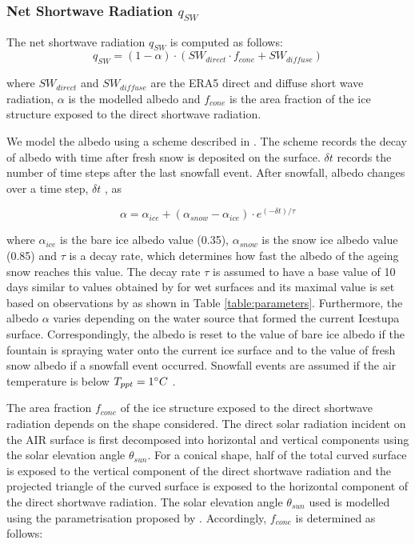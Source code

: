 \documentclass[utf8]{frontiersSCNS} %
\begin{document}
\subsubsection{Net Shortwave Radiation \texorpdfstring{$q_{SW}$}{Lg}} The net shortwave radiation $q_{SW}$ is computed as follows:
\begin{equation} q_{SW} = (1- \alpha)\cdot (SW_{direct} \cdot f_{cone} + SW_{diffuse}) \label{eqn:SW} \end{equation}

where $SW_{direct}$ and $SW_{diffuse}$ are the ERA5 direct and diffuse short wave radiation, $\alpha$ is the modelled
albedo and $f_{cone}$ is the area fraction of the ice structure exposed to the direct shortwave radiation.

We model the albedo using a scheme described in \cite{OerlemansKnap_1998}. The scheme records the decay of albedo with
time after fresh snow is deposited on the surface. $\delta t$ records the number of time steps after the last snowfall
event. After snowfall, albedo changes over a time step, $\delta t$ , as

\begin{equation} \alpha=\alpha_{ice}+(\alpha_{snow}-\alpha_{ice}) \cdot e^{(-\delta t)/\tau} \label{eqn:a}
\end{equation}

where $\alpha_{ice}$ is the bare ice albedo value (0.35), $\alpha_{snow}$ is the snow ice albedo value (0.85) and
$\tau$ is a decay rate, which determines how fast the albedo of the ageing snow reaches this value.  The decay rate
$\tau$ is assumed to have a base value of 10 days similar to values obtained by \cite{Schmidt_2017} for wet surfaces
and its maximal value is set based on observations by \cite{OerlemansKnap_1998} as shown in Table
\ref{table:parameters}.  Furthermore, the albedo $\alpha$ varies depending on the water source that formed the current
Icestupa surface.  Correspondingly, the albedo is reset to the value of bare ice albedo if the fountain is spraying
water onto the current ice surface and to the value of fresh snow albedo if a snowfall event occurred. Snowfall events
are assumed if the air temperature is below $T_{ppt}=1 \degree C$ \citep{FujitaAgeta_2000}.

The area fraction $f_{cone}$ of the ice structure exposed to the direct shortwave radiation depends on the shape
considered. The direct solar radiation incident on the AIR surface is first decomposed into horizontal and vertical
components using the solar elevation angle $\theta_{sun}$. For a conical shape, half of the total curved surface is
exposed to the vertical component of the direct shortwave radiation and the projected triangle of the curved surface is
exposed to the horizontal component of the direct shortwave radiation. The solar elevation angle $\theta_{sun}$ used is
modelled using the parametrisation proposed by \cite{Woolf_1968}. Accordingly, $f_{cone}$ is determined as follows:
\end{document}

